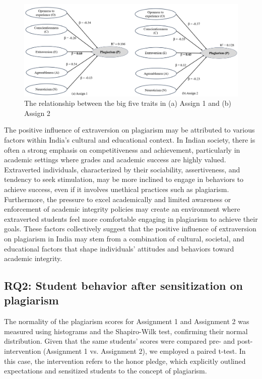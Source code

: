 \begin{figure}[ht]
  \centering\vspace{-8pt}
  \includegraphics[width=\columnwidth]{1.png}
  \caption{The relationship between the big five traits in (a) Assign 1 and (b) Assign 2}
  \label{fig:personalityAndPlagiarism}\vspace{-8pt}
\end{figure}

The positive influence of extraversion on plagiarism may be attributed to various factors within India's cultural and educational context. In Indian society, there is often a strong emphasis on competitiveness and achievement, particularly in academic settings where grades and academic success are highly valued. Extraverted individuals, characterized by their sociability, assertiveness, and tendency to seek stimulation, may be more inclined to engage in behaviors to achieve success, even if it involves unethical practices such as plagiarism. Furthermore, the pressure to excel academically and limited awareness or enforcement of academic integrity policies may create an environment where extraverted students feel more comfortable engaging in plagiarism to achieve their goals. These factors collectively suggest that the positive influence of extraversion on plagiarism in India may stem from a combination of cultural, societal, and educational factors that shape individuals' attitudes and behaviors toward academic integrity.


\subsection{RQ2: Student behavior after sensitization on plagiarism }
The normality of the plagiarism scores for Assignment 1 and Assignment 2 was measured using histograms and the Shapiro-Wilk test, confirming their normal distribution. Given that the same students' scores were compared pre- and post-intervention (Assignment 1 vs. Assignment 2), we employed a paired t-test. In this case, the intervention refers to the honor pledge, which explicitly outlined expectations and sensitized students to the concept of plagiarism.

